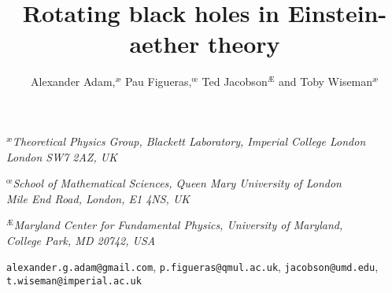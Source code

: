 \documentclass[12pt]{article}
\numberwithin{equation}{section}
\begin{document}
\title{{\bf Rotating black holes in Einstein-aether theory
}  }
\author{Alexander Adam,$^{\text{\ae}}$ Pau Figueras,$^{\text{\oe}}$ Ted Jacobson$^{\text{\AE}}$ and Toby Wiseman$^{\text{\ae}}$ }
\date{}
\maketitle
\thispagestyle{empty}

\begin{center}
\textit{$^{\text{\ae}}$Theoretical Physics Group, Blackett Laboratory, Imperial College London}\\ \textit{London SW7 2AZ, UK}
\vspace{0.5cm}

\textit{$^{\text{\oe}}$School of Mathematical Sciences, Queen Mary University of London}\\ \textit{ Mile End Road, London, E1 4NS, UK}
\vspace{1cm}

\textit{$^{\text{\AE}}$Maryland Center for Fundamental Physics, University of Maryland,}\\ \textit{College Park, MD 20742, USA}
\vspace{0.5cm}

{\small
\texttt{alexander.g.adam@gmail.com}, \texttt{p.figueras@qmul.ac.uk}, \texttt{jacobson@umd.edu}, 
\texttt{t.wiseman@imperial.ac.uk}
}
\end{center}
\end{document}
